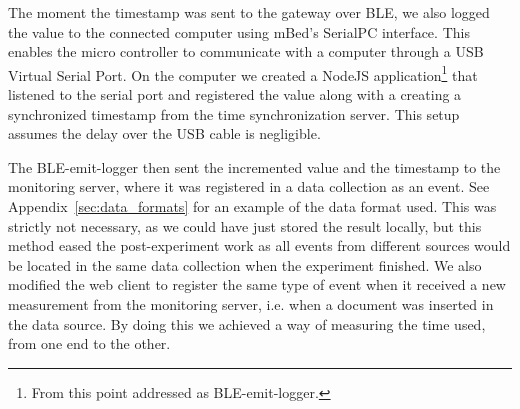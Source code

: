 The moment the timestamp was sent to the gateway over BLE, we also logged the value to the connected computer using mBed's SerialPC interface. This enables the micro controller to communicate with a computer through a USB Virtual Serial Port. On the computer we created a NodeJS application\footnote{ From this point addressed as BLE-emit-logger.} that listened to the serial port and registered the value along with a creating a synchronized timestamp from the time synchronization server. This setup assumes the delay over the USB cable is negligible. 

The BLE-emit-logger then sent the incremented value and the timestamp to the monitoring server, where it was registered in a data collection as an event. See Appendix~\ref{sec:data_formats} for an example of the data format used. This was strictly not necessary, as we could have just stored the result locally, but this method eased the post-experiment work as all events from different sources would be located in the same data collection when the experiment finished. We also modified the web client to register the same type of event when it received a new measurement from the monitoring server, i.e. when a document was inserted in the data source. By doing this we achieved a way of measuring the time used, from one end to the other.

